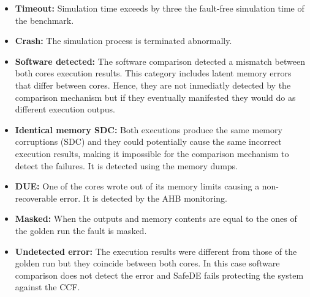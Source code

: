 \begin{itemize}
    \item \textbf{Timeout:} Simulation time exceeds by three the fault-free simulation time of the benchmark.
    \item \textbf{Crash:} The simulation process is terminated abnormally.
    \item \textbf{Software detected:} The software comparison detected a mismatch between both cores execution results. This category includes latent memory errors that differ between cores. Hence, they are not inmediatly detected by the comparison mechanism but if they eventually manifested they would do as different execution outpus.
    \item \textbf{Identical memory SDC:} Both executions produce the same memory corruptions (SDC) and they could potentially cause the same incorrect execution results, making it impossible for the comparison mechanism to detect the failures. It is detected using the memory dumps.
    \item \textbf{DUE:} One of the cores wrote out of its memory limits causing a non-recoverable error. It is detected by the AHB monitoring.
    \item \textbf{Masked:} When the outputs and memory contents are equal to the ones of the golden run the fault is masked.
    \item \textbf{Undetected error:} The execution results were different from those of the golden run but they coincide between both cores. In this case software comparison does not detect the error and SafeDE fails protecting the system against the CCF.
\end{itemize}






